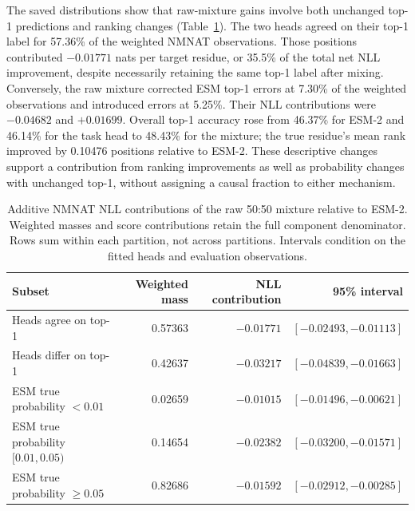 \documentclass[referee,pdflatex,sn-vancouver-num]{sn-jnl}
\begin{document}
The saved distributions show that raw-mixture gains involve both unchanged top-1 predictions and ranking changes (Table~\ref{tab:complementarity}). The two heads agreed on their top-1 label for 57.36\% of the weighted NMNAT observations. Those positions contributed $-0.01771$ nats per target residue, or 35.5\% of the total net NLL improvement, despite necessarily retaining the same top-1 label after mixing. Conversely, the raw mixture corrected ESM top-1 errors at 7.30\% of the weighted observations and introduced errors at 5.25\%. Their NLL contributions were $-0.04682$ and $+0.01699$. Overall top-1 accuracy rose from 46.37\% for ESM-2 and 46.14\% for the task head to 48.43\% for the mixture; the true residue's mean rank improved by 0.10476 positions relative to ESM-2. These descriptive changes support a contribution from ranking improvements as well as probability changes with unchanged top-1, without assigning a causal fraction to either mechanism.

\begin{table}[ht]
\centering\small
\caption{Additive NMNAT NLL contributions of the raw 50:50 mixture relative to ESM-2. Weighted masses and score contributions retain the full component denominator. Rows sum within each partition, not across partitions. Intervals condition on the fitted heads and evaluation observations.}\label{tab:complementarity}
\setlength{\tabcolsep}{2.8pt}
\begin{tabular}{lrrr}
\toprule
Subset & Weighted mass & NLL contribution & 95\% interval \\
\midrule
Heads agree on top-1 & 0.57363 & $-0.01771$ & $[-0.02493,-0.01113]$ \\
Heads differ on top-1 & 0.42637 & $-0.03217$ & $[-0.04839,-0.01663]$ \\
\midrule
ESM true probability $<0.01$ & 0.02659 & $-0.01015$ & $[-0.01496,-0.00621]$ \\
ESM true probability $[0.01,0.05)$ & 0.14654 & $-0.02382$ & $[-0.03200,-0.01571]$ \\
ESM true probability $\geq0.05$ & 0.82686 & $-0.01592$ & $[-0.02912,-0.00285]$ \\
\bottomrule
\end{tabular}
\end{table}
\end{document}
